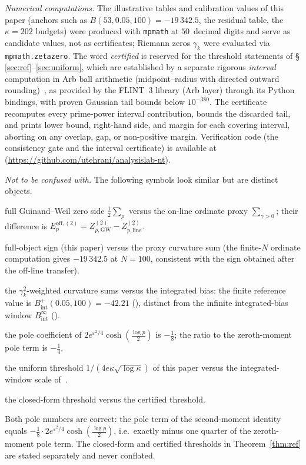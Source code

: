 \documentclass[11pt]{article}
\newcommand{\BinfGW}{B_{\mathrm{GW}}^{\infty}}   %
\newcommand{\Binfline}{B_{\mathrm{line}}^{\infty}} %
\newcommand{\ZtwoGW}{Z_{p,\mathrm{GW}}^{(2)}}   %
\newcommand{\Ztwoline}{Z_{p,\mathrm{line}}^{(2)}} %
\newcommand{\Eoff}{E_p^{\mathrm{off},(2)}}  %
\begin{document}
\medskip
\emph{Numerical computations.}
The illustrative tables and calibration values of this paper (anchors such as
$B(53,0.05,100)=-19\,342.5$, the residual table, the $\kappa=202$ budgets) were
produced with \texttt{mpmath} at $50$~decimal digits and serve as candidate
values, not as certificates; Riemann zeros $\gamma_k$ were evaluated via
\texttt{mpmath.zetazero}.
The word \emph{certified} is reserved for the threshold statements of
\S\,\ref{sec:ref}--\ref{sec:uniform}, which are established by a separate
rigorous \emph{interval} computation in Arb ball arithmetic (midpoint--radius
with directed outward rounding)~\cite{Johansson17}, as provided by the
FLINT~3 library (Arb layer) through its Python bindings, with proven Gaussian
tail bounds below $10^{-380}$. The certificate recomputes every prime-power
interval contribution, bounds the discarded tail, and prints lower bound,
right-hand side, and margin for each covering interval, aborting on any
overlap, gap, or non-positive margin.
Verification code (the consistency gate and the interval certificate) is
available at~\cite{Code}
(\url{https://github.com/utehrani/analysislab-nt}).

\medskip
\emph{Not to be confused with.}
The following symbols look similar but are distinct objects.
\begin{description}[leftmargin=2.6cm,style=nextline,itemsep=2pt]
\item[$\ZtwoGW$ vs.\ $\Ztwoline$] full Guinand--Weil zero side
  $\tfrac12\sum_\rho$ versus the on-line ordinate proxy $\sum_{\gamma>0}$;
  their difference is $\Eoff=\ZtwoGW-\Ztwoline$.
\item[$\BinfGW$ vs.\ $\Binfline$] full-object sign (this paper) versus the
  proxy curvature sum (the finite-$N$ ordinate computation gives $-19\,342.5$
  at $N=100$, consistent with the sign obtained after the off-line transfer).
\item[$\BinfGW,\Binfline$ vs.\ $B_{\mathrm{int}}$] the $\gamma_k^2$-weighted
  curvature sums versus the integrated bias: the finite reference value is
  $B_{\mathrm{int}}^+(0.05,100)=-42.21$ (\cite{Paper6,Paper7}), distinct from
  the infinite integrated-bias window $B_{\mathrm{int}}^\infty$ (\cite{Paper7}).
\item[pole $-\tfrac18$ vs.\ ratio $-\tfrac14$] the pole coefficient of
  $2e^{\varepsilon^2/4}\cosh(\tfrac{\log p}{2})$ is $-\tfrac18$; the ratio to
  the zeroth-moment pole term is $-\tfrac14$.
\item[$\varepsilon_0(\kappa)$ vs.\ $\varepsilon_{\mathrm{int}}(\kappa)$] the
  uniform threshold $1/(4e\kappa\sqrt{\log\kappa})$ of this paper versus the
  integrated-window scale of~\cite{Paper7}.
\item[$\varepsilon\le 0.004$ vs.\ $\varepsilon\le 0.05$] the closed-form
  threshold versus the certified threshold.
\end{description}
Both pole numbers are correct: the pole term of the second-moment identity
equals $-\tfrac18\cdot 2e^{\varepsilon^2/4}\cosh(\tfrac{\log p}{2})$, i.e.\
exactly minus one quarter of the zeroth-moment pole term.
The closed-form and certified thresholds in Theorem~\ref{thm:ref} are
stated separately and never conflated.
\end{document}
